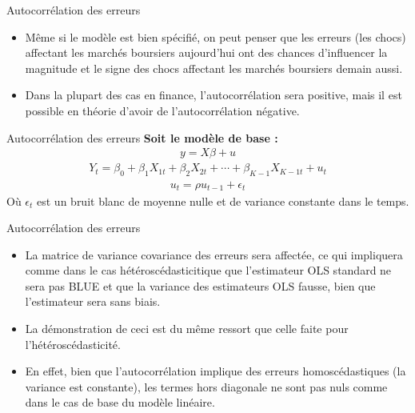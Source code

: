 \documentclass{beamer}
\begin{document}
\begin{frame}{Autocorrélation des erreurs}
\begin{itemize}
\item Même si le modèle est bien spécifié, on peut penser que les erreurs (les chocs) affectant les marchés boursiers aujourd’hui ont des chances d’influencer la magnitude et le signe des chocs affectant les marchés boursiers demain aussi.
\item Dans la plupart des cas en finance, l’autocorrélation sera positive, mais il est possible en théorie d’avoir de l’autocorrélation négative.
\end{itemize}
\end{frame}

\begin{frame}{Autocorrélation des erreurs}
\textbf{Soit le modèle de base :}
\begin{align*}
y=X \beta +u
\end{align*}
\begin{align*}
Y_t=\beta_0+\beta_1 X_{1t}+\beta_2 X_{2t}+\cdots+\beta_{K-1} X_{K-1t}+u_t
\end{align*}
\begin{align*}
u_t=\rho u_{t-1}+\epsilon_t
\end{align*}
Où $\epsilon_t$ est un bruit blanc de moyenne nulle et de variance constante dans le temps.
\end{frame}

\begin{frame}{Autocorrélation des erreurs}
\begin{itemize}
\item La matrice de variance covariance des erreurs sera affectée, ce qui impliquera comme dans le cas hétéroscédasticitique que l’estimateur OLS standard ne sera pas BLUE et que la variance des estimateurs OLS fausse, bien que l’estimateur sera sans biais. 
\item La démonstration de ceci est du même ressort que celle faite pour l’hétéroscédasticité.
\item En effet, bien que l’autocorrélation implique des erreurs homoscédastiques (la variance est constante), les termes hors diagonale ne sont pas nuls comme dans le cas de base du modèle linéaire. 
\end{itemize}
\end{frame}
\end{document}
